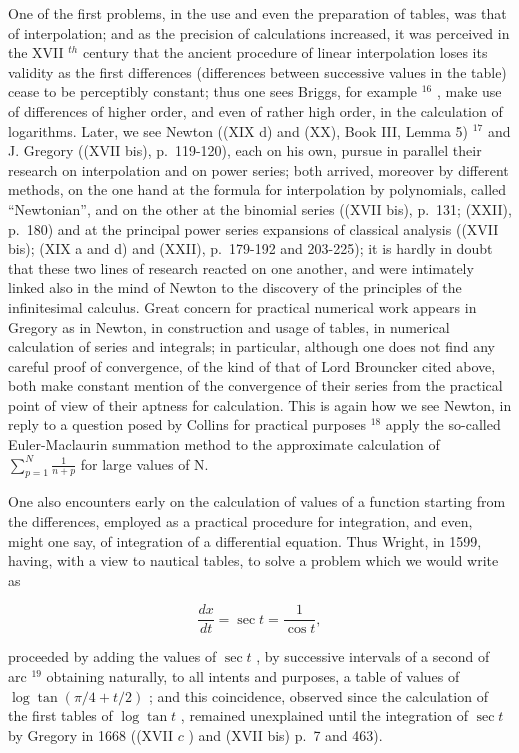 One of the first problems, in the use and even the preparation of tables, was that of interpolation; and as the precision of calculations increased, it was perceived in the XVII \(^{th}\) century that the ancient procedure of linear interpolation loses its validity as the first differences (differences between successive values in the table) cease to be perceptibly constant; thus one sees Briggs, for example \({}^{16}\) , make use of differences of higher order, and even of rather high order, in the calculation of logarithms. Later, we see Newton ((XIX d) and (XX), Book III, Lemma 5) \({}^{17}\) and J. Gregory ((XVII bis), p.~119-120), each on his own, pursue in parallel their research on interpolation and on power series; both arrived, moreover by different methods, on the one hand at the formula for interpolation by polynomials, called ``Newtonian'', and on the other at the binomial series ((XVII bis), p.~131; (XXII), p.~180) and at the principal power series expansions of classical analysis ((XVII bis); (XIX a and d) and (XXII), p.~179-192 and 203-225); it is hardly in doubt that these two lines of research reacted on one another, and were intimately linked also in the mind of Newton to the discovery of the principles of the infinitesimal calculus. Great concern for practical numerical work appears in Gregory as in Newton, in construction and usage of tables, in numerical calculation of series and integrals; in particular, although one does not find any careful proof of convergence, of the kind of that of Lord Brouncker cited above, both make constant mention of the convergence of their series from the practical point of view of their aptness for calculation. This is again how we see Newton, in reply to a question posed by Collins for practical purposes \({}^{18}\) apply the so-called Euler-Maclaurin summation method to the approximate calculation of \(\sum_{p=1}^{N}\frac{1}{n+p}\) for large values of N.

One also encounters early on the calculation of values of a function starting from the differences, employed as a practical procedure for integration, and even, might one say, of integration of a differential equation. Thus Wright, in 1599, having, with a view to nautical tables, to solve a problem which we would write as

\[
{\frac {d x}{d t}} = \sec t = {\frac {1}{\cos t}},
\]

proceeded by adding the values of \(\sec t\) , by successive intervals of a second of arc \(^{19}\) obtaining naturally, to all intents and purposes, a table of values of \(\log \tan (\pi / 4 + t / 2)\) ; and this coincidence, observed since the calculation of the first tables of \(\log \tan t\) , remained unexplained until the integration of \(\sec t\) by Gregory in 1668 ((XVII \(c\) ) and (XVII bis) p.~7 and 463).

